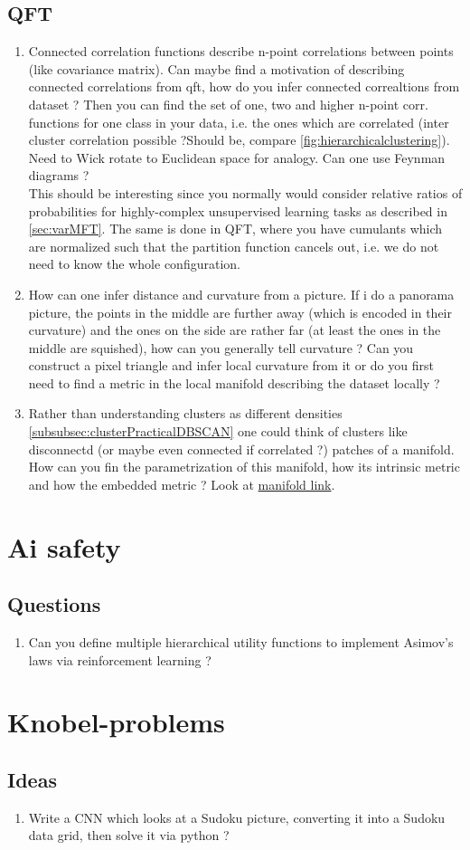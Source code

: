 \subsection{QFT}
\begin{enumerate}
	\item Connected correlation functions describe n-point correlations between points (like covariance matrix). Can maybe find a motivation of describing connected correlations from qft, how do you infer connected correaltions from dataset ? Then you can find the set of one, two and higher n-point corr. functions for one class in your data, i.e. the ones which are correlated (inter cluster correlation possible ?Should be, compare \ref{fig:hierarchicalclustering}). Need to Wick rotate to Euclidean space for analogy. Can one use Feynman diagrams ?\\
	This should be interesting since you normally would consider relative ratios of probabilities for highly-complex unsupervised learning tasks as described in \ref{sec:varMFT}. The same is done in QFT, where you have cumulants which are normalized such that the partition function cancels out, i.e. we do not need to know the whole configuration.
	\item How can one infer distance and curvature from a picture. If i do a panorama picture, the points in the middle are further away (which is encoded in their curvature) and the ones on the side are rather far (at least the ones in the middle are squished), how can you generally tell curvature ? Can you construct a pixel triangle and infer local curvature from it or do you first need to find a metric in the local manifold describing the dataset locally ?
	\item Rather than understanding clusters as different densities  \ref{subsubsec:clusterPracticalDBSCAN} one could think of clusters like disconnectd (or maybe even connected if correlated ?) patches of a manifold. How can you fin the parametrization of this manifold, how its intrinsic metric and how the embedded metric ? Look at \href{https://arxiv.org/pdf/1802.03426.pdf}{manifold link}.
\end{enumerate}
\section{Ai safety}
\subsection{Questions}
\begin{enumerate}
	\item Can you define multiple hierarchical utility functions to implement Asimov's laws via reinforcement learning ?
\end{enumerate}
\section{Knobel-problems}
\subsection{Ideas}
\begin{enumerate}
	\item Write a CNN which looks at a Sudoku picture, converting it into a Sudoku data grid, then solve it via python ?
\end{enumerate}